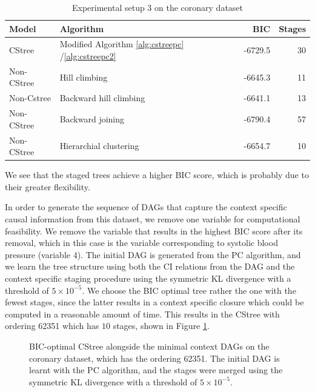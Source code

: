 \documentclass{tufte-book}
\begin{document}
\begin{table}[htbp]
\caption{\label{tab:org48113eb}Experimental setup 3 on the coronary dataset}
\centering
\begin{tabular}{l|l|r|r}
\hline
Model & Algorithm & BIC & Stages\\
\hline
CStree & Modified Algorithm \ref{alg:cstreepc} /\ref{alg:cstreepc2} & -6729.5 & 30\\
Non-CStree & Hill climbing & -6645.3 & 11\\
Non-Cstree & Backward hill climbing & -6641.1 & 13\\
Non-CStree & Backward joining & -6790.4 & 57\\
Non-CStree & Hierarchial clustering & -6654.7 & 10\\
\end{tabular}
\end{table}



We see that the staged trees achieve a higher BIC score, which is probably due to their greater flexibility.


In order to generate the sequence of DAGs that capture the context specific causal information from this dataset, we remove one variable for computational feasibility. We remove the variable that results in the highest BIC score after its removal, which in this case is the variable corresponding to systolic blood pressure (variable 4). The initial DAG is generated from the PC algorithm, and we learn the tree structure using both the CI relations from the DAG and the context specific staging procedure using the symmetric KL divergence with a threshold of \(5\times 10^{-5}\). We choose the BIC optimal tree rather the one with the fewest stages, since the latter results in a context specific closure which could be computed in a reasonable amount of time.  This results in the CStree with ordering 62351 which has \(10\) stages, shown in Figure \ref{fig:coronary_wout4}. 


\begin{figure}[!h]\label{fig:coronary_wout4}
   \begin{floatrow}
%
\caption{BIC-optimal CStree alongside the minimal context DAGs on the coronary dataset, which has the ordering 62351. The initial DAG is learnt with the PC algorithm, and the stages were merged using the symmetric KL divergence with a threshold of $5\times 10^{-5}$. }
        
   \end{floatrow}
\end{figure}
\end{document}
